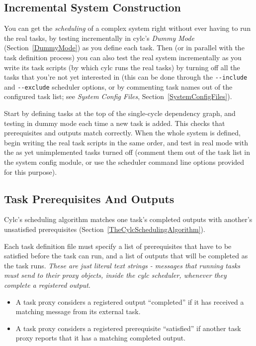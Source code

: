 \documentclass[11pt,a4paper]{article}
\begin{document}
\subsection{Incremental System Construction} 
\label{IncrementalSystemConstruction}

You can get the {\em scheduling} of a complex system right without ever
having to run the real tasks, by testing incrementally in cylc's {\em
Dummy Mode} (Section~\ref{DummyMode}) as you define each task. Then (or
in parallel with the task definition process) you can also test the real
system incrementally as you write its task scripts (by which cylc runs
the real tasks) by turning off all the tasks that you're not yet
interested in (this can be done through the \lstinline=--include= and
\lstinline=--exclude= scheduler options, or by commenting task names out
of the configured task list; see {\em System Config Files},
Section~\ref{SystemConfigFiles}).

Start by defining tasks at the top of the single-cycle dependency graph,
and testing in dummy mode each time a new task is added. This checks
that prerequisites and outputs match correctly. When the whole system is
defined, begin writing the real task scripts in the same order, and test
in real mode with the as yet unimplemented tasks turned off (comment
them out of the task list in the system config module, or use the
scheduler command line options provided for this purpose). 


\subsection{Task Prerequisites And Outputs}
\label{TaskPrerequisitesAndOutputs}

Cylc's scheduling algorithm matches one task's completed outputs with
another's unsatisfied prerequisites
(Section~\ref{TheCylcSchedulingAlgorithm}).  

Each task definition file must specify a list of prerequisites that have
to be satisfied before the task can run, and a list of outputs that will
be completed as the task runs. {\em These are just literal text
strings - messages that running tasks must send to their proxy objects,
inside the cylc scheduler, whenever they complete a registered output}.

\begin{itemize}
    \item A task proxy considers a registered output ``completed''
        if it has received a matching message from its external task.

    \item A task proxy considers a registered prerequisite ``satisfied''
        if another task proxy reports that it has a matching completed
        output.

\end{itemize}
\end{document}
